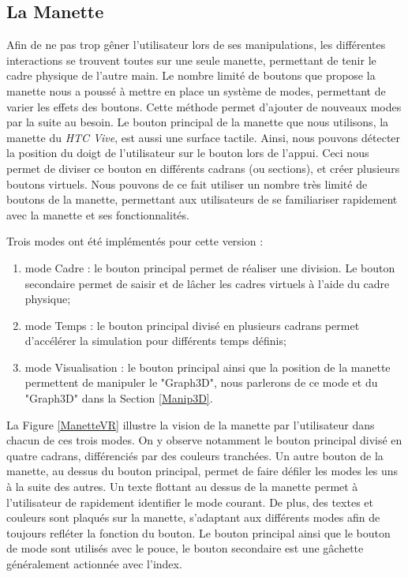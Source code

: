 		\subsection{La Manette}		
		Afin de ne pas trop gêner l'utilisateur lors de ses manipulations, les différentes interactions se trouvent toutes sur une seule manette, permettant de tenir le cadre physique de l'autre main. Le nombre limité de boutons que propose la manette nous a poussé à mettre en place un système de modes, permettant de varier les effets des boutons. Cette méthode permet d'ajouter de nouveaux modes par la suite au besoin. 		
		Le bouton principal de la manette que nous utilisons, la manette du \textit{HTC Vive}, est aussi une surface tactile. Ainsi, nous pouvons détecter la position du doigt de l'utilisateur sur le bouton lors de l'appui. Ceci nous permet de diviser ce bouton en différents cadrans (ou sections), et créer plusieurs boutons virtuels. Nous pouvons de ce fait utiliser un nombre très limité de boutons de la manette, permettant aux utilisateurs de se familiariser rapidement avec la manette et ses fonctionnalités. 
		
		Trois modes ont été implémentés pour cette version :		
		\begin{enumerate}
			\item mode Cadre : le bouton principal permet de réaliser une division. Le bouton secondaire permet de saisir et de lâcher les cadres virtuels à l'aide du cadre physique;
			\item mode Temps : le bouton principal divisé en plusieurs cadrans permet d'accélérer la simulation pour différents temps définis;
			\item mode Visualisation : le bouton principal ainsi que la position de la manette permettent de manipuler le "Graph3D", nous parlerons de ce mode et du "Graph3D" dans la Section \ref{Manip3D}.
		\end{enumerate}
		
		La Figure \ref{ManetteVR} illustre la vision de la manette par l'utilisateur dans chacun de ces trois modes. On y observe notamment le bouton principal divisé en quatre cadrans, différenciés par des couleurs tranchées. Un autre bouton de la manette, au dessus du bouton principal, permet de faire défiler les modes les uns à la suite des autres. Un texte flottant au dessus de la manette permet à l'utilisateur de rapidement identifier le mode courant. De plus, des textes et couleurs sont plaqués sur la manette, s'adaptant aux différents modes afin de toujours refléter la fonction du bouton. Le bouton principal ainsi que le bouton de mode sont utilisés avec le pouce, le bouton secondaire est une gâchette généralement actionnée avec l'index.
		
